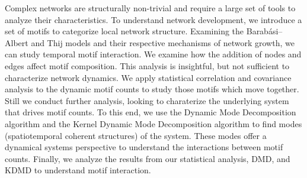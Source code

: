 

Complex networks are structurally non-trivial and require a large set of
tools to analyze their characteristics. To understand network development,
 we introduce a set of motifs to categorize local network structure. 
Examining the Barabási–Albert and Thij models and their respective mechanisms of 
network growth, we can study temporal motif interaction. We examine how the addition of
nodes and edges affect motif composition. This analysis is insightful, but not sufficient to characterize
network dynamics.
We apply statistical correlation and covariance analysis to the dynamic motif counts to study those motifs which
move together. Still we conduct further analysis, looking to charaterize the underlying system
that drives motif counts. To this end, we use the Dynamic Mode Decomposition algorithm and the Kernel Dynamic Mode
Decomposition algorithm to find modes (spatiotemporal coherent structures) of the system. These modes offer
a dynamical systems perspective to understand the interactions between motif counts. Finally, we analyze
the results from our statistical analysis, DMD, and KDMD to understand motif interaction.
